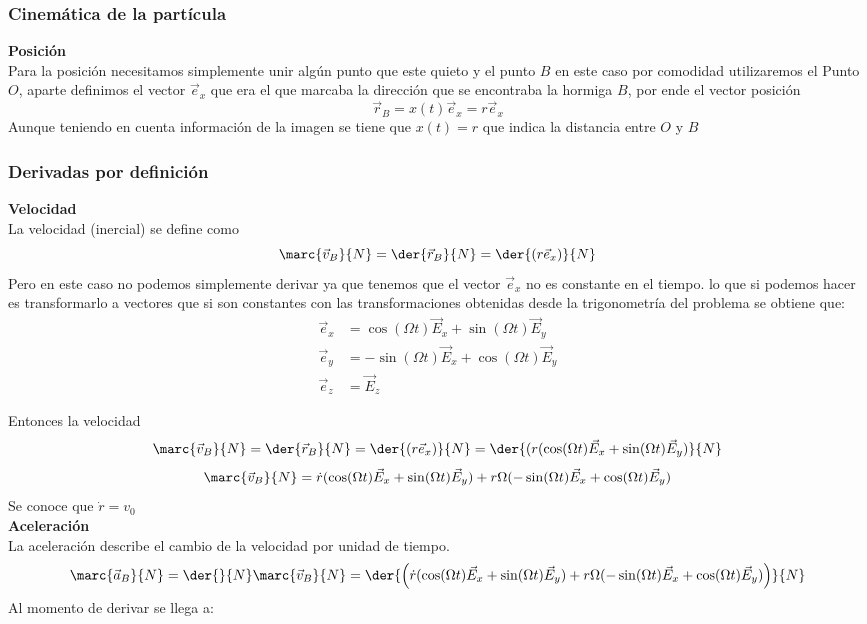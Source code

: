 \begin{tcolorbox}[colframe=black!50!white, %
        title= Solucion Hormiga Velocista (Definición), breakable]
\subsubsection*{Cinemática de la partícula}
\textbf{Posición}\\
Para la posición necesitamos simplemente unir algún punto que este quieto y el punto $B$ en este caso por comodidad utilizaremos el Punto $O$, aparte definimos el vector $\vec{e}_x$ que era el que marcaba la dirección que se encontraba la hormiga $B$, por ende el vector posición
$$\vec{r}_B=x(t)\vec{e}_x=r\vec{e}_x$$ 
Aunque teniendo en cuenta información de la imagen se tiene que $x(t)=r$ que indica la distancia entre $O$ y $B$\\
\subsubsection*{Derivadas por definición}
\textbf{Velocidad}\\
La velocidad (inercial) se define como
$$\marc{\vec{v}_B}{N}=\der{\vec{r}_B}{N}=\der{(r\vec{e}_x)}{N}$$
Pero en este caso no podemos simplemente derivar ya que tenemos que el vector $\vec{e}_x$ no es constante en el tiempo. lo que si podemos hacer es transformarlo a vectores que si son constantes
con las transformaciones obtenidas desde la trigonometría del problema se obtiene que:
\begin{equation*}
\begin{split}
    \vec{e}_x&=\cos(\Omega t)\vec{E}_x+\sin(\Omega t)\vec{E}_y\\
    \vec{e}_y&=-\sin(\Omega t)\vec{E}_x+\cos(\Omega t)\vec{E}_y\\
    \vec{e}_z&=\vec{E}_z
\end{split}
\end{equation*}

Entonces la velocidad
$$\marc{\vec{v}_B}{N}=\der{\vec{r}_B}{N}=\der{(r\vec{e}_x)}{N}=\der{(r(\cos(\Omega t)\vec{E}_x+\sin(\Omega t)\vec{E}_y)}{N}$$
$$\marc{\vec{v}_B}{N}=\dot{r}(\cos(\Omega t)\vec{E}_x+\sin(\Omega t)\vec{E}_y)+r\Omega (-\sin(\Omega t)\vec{E}_x+\cos(\Omega t)\vec{E}_y)$$
Se conoce que $\dot{r}=v_0$\\
\textbf{Aceleración}\\
La aceleración describe el cambio de la velocidad por unidad de tiempo.\\
$$\marc{\vec{a}_B}{N}=\der{}{N}\marc{\vec{v}_B}{N}=\der{\left(\dot{r}(\cos(\Omega t)\vec{E}_x+\sin(\Omega t)\vec{E}_y)+r\Omega (-\sin(\Omega t)\vec{E}_x+\cos(\Omega t)\vec{E}_y)\right)}{N}$$
Al momento de derivar se llega a:


\end{tcolorbox}
